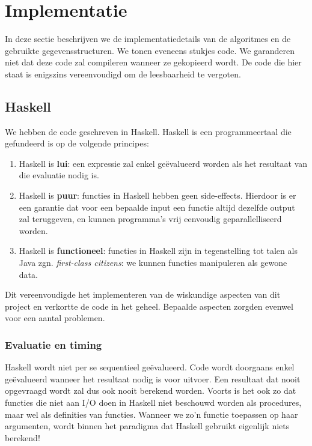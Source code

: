 \newpage
\section{Implementatie}
\label{sec:implementation}
In deze sectie beschrijven we de implementatiedetails van de
algoritmes en de gebruikte gegevensstructuren. We tonen eveneens
stukjes code. We garanderen niet dat deze code zal compileren wanneer
ze gekopieerd wordt. De code die hier staat is enigszins vereenvoudigd
om de leesbaarheid te vergoten.

\subsection{Haskell}
We hebben de code geschreven in Haskell. Haskell is een programmeertaal die gefundeerd is op de volgende principes:

\begin{enumerate}
\item Haskell is \textbf{lui}: een expressie zal enkel ge\"evalueerd
worden als het resultaat van die evaluatie nodig is.
\item Haskell is \textbf{puur}: functies in Haskell hebben geen
side-effects. Hierdoor is er een garantie dat voor een bepaalde input
een functie altijd dezelfde output zal teruggeven, en kunnen
programma's vrij eenvoudig geparallelliseerd worden.
\item Haskell is \textbf{functioneel}: functies in Haskell zijn in
tegenstelling tot talen als Java zgn. \textit{first-class citizens}:
we kunnen functies manipuleren als gewone data.
\end{enumerate}

Dit vereenvoudigde het implementeren van de wiskundige aspecten van
dit project en verkortte de code in het geheel. Bepaalde aspecten
zorgden evenwel voor een aantal problemen.

\subsubsection{Evaluatie en timing}

Haskell wordt niet per se sequentieel ge\"evalueerd. Code wordt
doorgaans enkel ge\"evalueerd wanneer het resultaat nodig is voor
uitvoer.  Een resultaat dat nooit opgevraagd wordt zal dus ook nooit
berekend worden. Voorts is het ook zo dat functies die niet aan I/O
doen in Haskell niet beschouwd worden als procedures, maar wel als
definities van functies. Wanneer we zo'n functie toepassen op haar
argumenten, wordt binnen het paradigma dat Haskell gebruikt eigenlijk
niets berekend!

